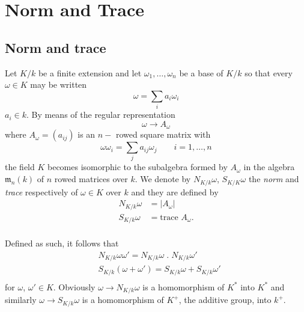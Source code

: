 \chapter{Norm and Trace}\label{chap4}%

\section{Norm and trace}\label{c4:s1}\pageoriginale%
 Let $ K/k $ be a finite extension and let $ \omega_1 , \ldots ,
 \omega_n $ be a base of $ K/k $ so that every $ \omega \in K $ may be
 written  
 $$
 \omega = \sum_{i} a_i \omega_i
 $$
 $a_i \in k $. By means of the regular representation 
 $$
 \omega \rightarrow A_\omega  
 $$
 where $ A_\omega = ( a_{ij} ) $ is an $n-$ rowed square  matrix with  
 $$
 \omega \omega_i = \sum_{j} a_{ij} \omega_j \qquad i = 1, \ldots , n  
 $$
 the field $ K $  becomes isomorphic to the subalgebra formed by $
 A_\omega $ in the algebra $ \mathfrak{m}_n (k) $ of $n$ rowed
 matrices over $k$. We denote by $ N_{K/k} \omega$, $S_{K/K}\omega $
 the  \textit{norm} and \textit{trace} respectively of  $ \omega \in K
 $ over $k$ and  they are defined by  
 \begin{align*}
N_{K/k} \omega &=\left| A_\omega \right|\\
S_{K/k} \omega &= \text{trace }   A_\omega.\\
 \end{align*} 
 
 Defined as such, it follows that 
 \begin{align*}
& N_{K/k} \omega \omega'  = N_{K/k} \omega \; . \;  N_{K/k} \omega' \\ 
& S_{K/k} ( \omega + \omega' ) = S_{K/k}  \omega +  S_{K/k}  \omega' \\
 \end{align*}
  for $\omega$, $\omega' \in K $. Obviously $ \omega \rightarrow
 N_{K/k} \omega $ is a homomorphism of $ K^* $ into $K^*$  and
 similarly $ \omega \rightarrow S_{K/k} \omega $ is a homomorphism of $
 K^+ $, the additive group, into $k^+ $. 
 
